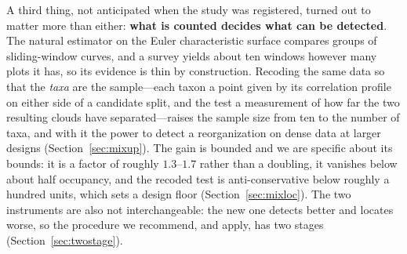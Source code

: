 \documentclass[review,12pt,authoryear]{elsarticle}
\theoremstyle{remark}
\begin{document}
A third thing, not anticipated when the study was registered, turned out to
matter more than either: \textbf{what is counted decides what can be
detected}. The natural estimator on the Euler characteristic surface
compares groups of sliding-window curves, and a survey yields about ten
windows however many plots it has, so its evidence is thin by construction.
Recoding the same data so that the \emph{taxa} are the sample---each taxon a
point given by its correlation profile on either side of a candidate split,
and the test a measurement of how far the two resulting clouds have
separated---raises the sample size from ten to the number of taxa, and with
it the power to detect a reorganization on dense data at larger designs
(Section~\ref{sec:mixup}). The gain is bounded and we are specific about its
bounds: it is a factor of roughly $1.3$--$1.7$ rather than a doubling, it
vanishes below about half occupancy, and the recoded test is
anti-conservative below roughly a hundred units, which sets a design floor
(Section~\ref{sec:mixloc}). The two instruments are also not
interchangeable: the new one detects better and locates worse, so the
procedure we recommend, and apply, has two stages
(Section~\ref{sec:twostage}).
\end{document}
